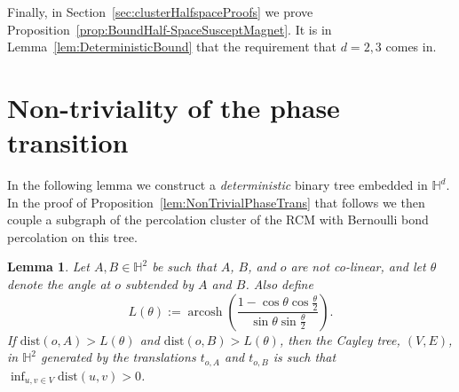 \documentclass[10pt,a4paper,dvipsnames]{article}
\newtheorem{lemma}[theorem]{Lemma}
\theoremstyle{definition}
\theoremstyle{remark}
\newcommand{\HypTwo}{{\mathbb{H}^2}}
\newcommand{\HypDim}{{\mathbb{H}^d}}
\DeclareMathOperator{\arcosh}{arcosh}
\newcommand{\dist}[1]{\mathrm{dist}\left(#1\right)}
\newcommand{\orig}{o}
\numberwithin{equation}{section}
\begin{document}
Finally, in Section~\ref{sec:clusterHalfspaceProofs} we prove Proposition~\ref{prop:BoundHalf-SpaceSusceptMagnet}. It is in Lemma~\ref{lem:DeterministicBound} that the requirement that $d=2,3$ comes in. 



\section{Non-triviality of the phase transition}
\label{sec:NonTrivialPhaseTransition}


In the following lemma we construct a \emph{deterministic} binary tree embedded in $\HypDim$. In the proof of Proposition~\ref{lem:NonTrivialPhaseTrans} that follows we then couple a subgraph of the percolation cluster of the RCM with Bernoulli bond percolation on this tree. 

\begin{lemma}
\label{lem:splittingLength}
    Let $A,B\in\HypTwo$ be such that $A$, $B$, and $\orig$ are not co-linear, and let $\theta$ denote the angle at $\orig$ subtended by $A$ and $B$. Also define
    \begin{equation}
    \label{eqn:avoidancelength}
        L\left(\theta\right) := \arcosh\left(\frac{1-\cos\theta\cos\frac{\theta}{2}}{\sin\theta\sin\frac{\theta}{2}}\right).
    \end{equation}
    If $\dist{\orig,A}>L(\theta)$ and $\dist{\orig,B}>L(\theta)$, then 
    the Cayley tree, $(V,E)$, in $\HypTwo$ generated by the translations $t_{\orig,A}$ and $t_{\orig,B}$
    is such that 
    $\inf_{u,v\in V}\dist{u,v}>0$.
\end{lemma}
\end{document}
